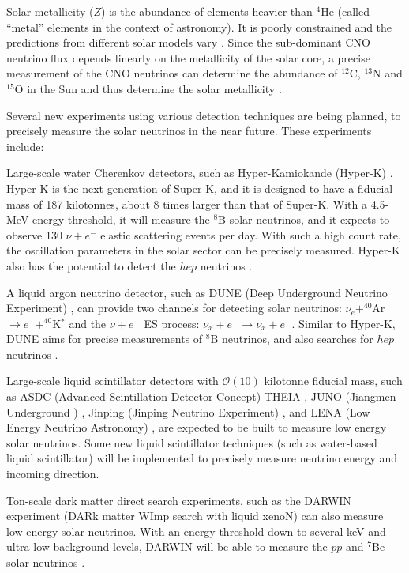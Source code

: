 Solar metallicity ($Z$) is the abundance of elements heavier than $^4$He (called ``metal'' elements in the context of astronomy). It is poorly constrained and the predictions from different solar models vary \cite{vagnozzi2017solar}. Since the sub-dominant CNO neutrino flux depends linearly on the metallicity of the solar core, a precise measurement of the CNO neutrinos can determine the abundance of $^{12}$C, $^{13}$N and $^{15}$O in the Sun and thus determine the solar metallicity \cite{cerdeno2018cno}.

Several new experiments using various detection techniques are being planned, to precisely measure the solar neutrinos in the near future. These experiments include:

Large-scale water Cherenkov detectors, such as Hyper-Kamiokande (Hyper-K) \cite{websiteHyperK}. Hyper-K is the next generation of Super-K, and it is designed to have a fiducial mass of 187 kilotonnes, about 8 times larger than that of Super-K. With a 4.5-MeV energy threshold, it will measure the $^8$B solar neutrinos, and it expects to observe 130 $\nu+e^-$ elastic scattering events per day. With such a high count rate, the oscillation parameters in the solar sector can be precisely measured. Hyper-K also has the potential to detect the $hep$ neutrinos \cite{yano2019solar}.

A liquid argon neutrino detector, such as DUNE (Deep Underground Neutrino Experiment) \cite{websiteDune}, can provide two channels for detecting solar neutrinos: $\nu_e+^{40}$Ar$\to e^-+^{40}$K$^*$ and the $\nu+e^-$ ES process: $\nu_x+e^-\to\nu_x+e^-$. Similar to Hyper-K, DUNE aims for precise measurements of $^8$B neutrinos, and also searches for $hep$ neutrinos \cite{capozzi2019dune}.

Large-scale liquid scintillator detectors with $\mathcal{O}(10)$ kilotonne fiducial mass, such as ASDC (Advanced Scintillation Detector Concept)-THEIA \cite{askins2020theia}, JUNO (Jiangmen Underground ) \cite{giaz2018status}, Jinping (Jinping Neutrino Experiment) \cite{beacom2017physics}, and LENA (Low Energy Neutrino Astronomy) \cite{wurm2013studying}, are expected to be built to measure low energy solar neutrinos. Some new liquid scintillator techniques (such as water-based liquid scintillator) will be implemented to precisely measure neutrino energy and incoming direction. %

Ton-scale dark matter direct search experiments, such as the DARWIN experiment (DARk matter WImp search with liquid xenoN) can also measure low-energy solar neutrinos. With an energy threshold down to several keV and ultra-low background levels, DARWIN will be able to measure the $pp$ and $^7$Be solar neutrinos \cite{baudis2014neutrino,aalbers2016darwin,aalbers2020solar}.

